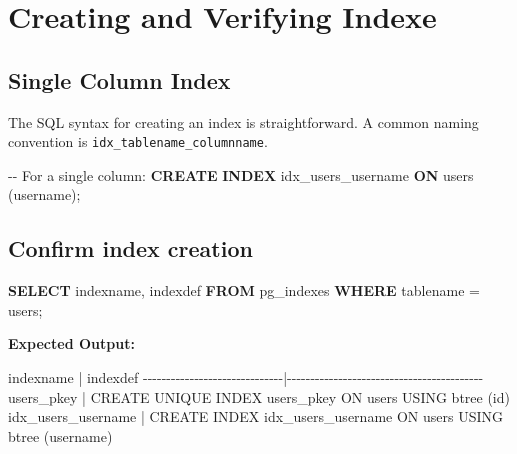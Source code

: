 \documentclass[
]{report}
\newenvironment{Shaded}{\begin{snugshade}}{\end{snugshade}}
\newcommand{\CommentTok}[1]{\textcolor[rgb]{0.37,0.37,0.37}{#1}}
\newcommand{\KeywordTok}[1]{\textcolor[rgb]{0.00,0.23,0.31}{\textbf{#1}}}
\newcommand{\NormalTok}[1]{\textcolor[rgb]{0.00,0.23,0.31}{#1}}
\newcommand{\OperatorTok}[1]{\textcolor[rgb]{0.37,0.37,0.37}{#1}}
\newcommand{\StringTok}[1]{\textcolor[rgb]{0.13,0.47,0.30}{#1}}
\begin{document}
\chapter{Creating and Verifying
Indexe}\label{creating-and-verifying-indexe}

\section{Single Column Index}\label{single-column-index}

The SQL syntax for creating an index is straightforward. A common naming
convention is \texttt{idx\_tablename\_columnname}.

\begin{Shaded}
\begin{Highlighting}[]
\CommentTok{{-}{-} For a single column:}
\KeywordTok{CREATE} \KeywordTok{INDEX}\NormalTok{ idx\_users\_username }
\KeywordTok{ON}\NormalTok{ users (username);}
\end{Highlighting}
\end{Shaded}

\section{Confirm index creation}\label{confirm-index-creation}

\begin{Shaded}
\begin{Highlighting}[]
\KeywordTok{SELECT}\NormalTok{ indexname, indexdef }
\KeywordTok{FROM}\NormalTok{ pg\_indexes }
\KeywordTok{WHERE}\NormalTok{ tablename }\OperatorTok{=} \StringTok{\textquotesingle{}users\textquotesingle{}}\NormalTok{;}
\end{Highlighting}
\end{Shaded}

\textbf{Expected Output:}

\begin{Shaded}
\begin{Highlighting}[]
\NormalTok{indexname                     | indexdef}
\NormalTok{{-}{-}{-}{-}{-}{-}{-}{-}{-}{-}{-}{-}{-}{-}{-}{-}{-}{-}{-}{-}{-}{-}{-}{-}{-}{-}{-}{-}{-}{-}|{-}{-}{-}{-}{-}{-}{-}{-}{-}{-}{-}{-}{-}{-}{-}{-}{-}{-}{-}{-}{-}{-}{-}{-}{-}{-}{-}{-}{-}{-}{-}{-}{-}{-}{-}{-}{-}{-}{-}{-}{-}{-}}
\NormalTok{users\_pkey                    | CREATE UNIQUE INDEX users\_pkey ON users USING btree (id)}
\NormalTok{idx\_users\_username            | CREATE INDEX idx\_users\_username ON users USING btree (username)}
\end{Highlighting}
\end{Shaded}
\end{document}

